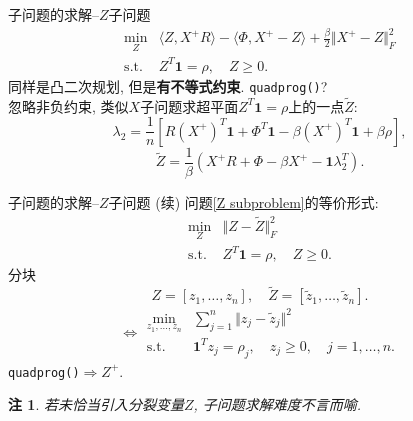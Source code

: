 \documentclass{beamer}
\newcommand*{\beq}[1]{{\textcolor[rgb]{0,0,0.67}{\eqref{#1}}}}
\newcommand{\st}{\mathrm{s.t.}}
\newcommand{\one}{\mathbf{1}}
\begin{document}
\begin{frame}{子问题的求解--$Z$子问题}
\begin{equation}
	\begin{array}{rl}
		\min\limits_Z & \langle Z,X^+R\rangle-\langle\Phi,X^+-Z\rangle+\frac{\beta}{2}\Vert X^+-Z\Vert_F^2\\
		\st & Z^T\one=\rho,\quad Z\ge0.
	\end{array}
	\label{Z subproblem}
\end{equation}
同样是凸二次规划, 但是\textbf{有不等式约束}. \pause\texttt{quadprog()}?\pause\\[1em]
忽略非负约束, 类似$X$子问题求超平面$Z^T\one=\rho$上的一点$\widetilde Z$:
$$\lambda_2=\frac{1}{n}\left[R\left(X^+\right)^T\one+\Phi^T\one-\beta\left(X^+\right)^T\one+\beta\rho\right],$$
$$\widetilde Z=\frac{1}{\beta}(X^+R+\Phi-\beta X^+-\one\lambda_2^T).$$
\end{frame}
\newtheorem{rem}{注}
\begin{frame}{子问题的求解--$Z$子问题 (续)}
问题\beq{Z subproblem}的等价形式:
\begin{equation*}
	\begin{array}{rl}
		\min\limits_Z & \Vert Z-\widetilde Z\Vert_F^2\\
		\st & Z^T\one=\rho,\quad Z\ge0.
	\end{array}
\end{equation*}\pause
分块
$$Z=[z_1,\ldots,z_n],\quad\widetilde Z=[\tilde z_1,\ldots,\tilde z_n].$$
\begin{equation}
	\Leftrightarrow\begin{array}{rl}
		\min\limits_{z_1,\ldots,z_n} & \sum\limits_{j=1}^n\Vert z_j-\tilde z_j\Vert^2\\
		\st & \one^Tz_j=\rho_j,\quad z_j\ge0,\quad j=1,\ldots,n.
	\end{array}
	\label{Z subproblem equal 2}
\end{equation}
\texttt{quadprog()}$\Rightarrow Z^+$.\pause
\begin{rem}
若未恰当引入分裂变量$Z$, 子问题求解难度不言而喻.
\end{rem}
\end{frame}
\end{document}
